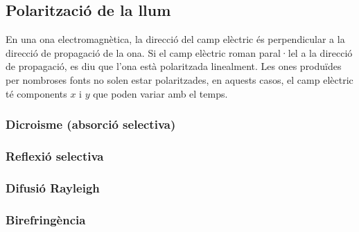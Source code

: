 \subsection{Polarització de la llum}
En una ona electromagnètica, la direcció del camp elèctric és perpendicular a la direcció de propagació de la ona. Si el camp elèctric roman paral·lel a la direcció de propagació, es diu que l'ona està polaritzada linealment. Les ones produïdes per nombroses fonts no solen estar polaritzades, en aquests casos, el camp elèctric té components $x$ i $y$ que poden variar amb el temps.
\subsubsection*{Dicroisme (absorció selectiva)}

\subsubsection*{Reflexió selectiva}

\subsubsection*{Difusió Rayleigh}

\subsubsection*{Birefringència}